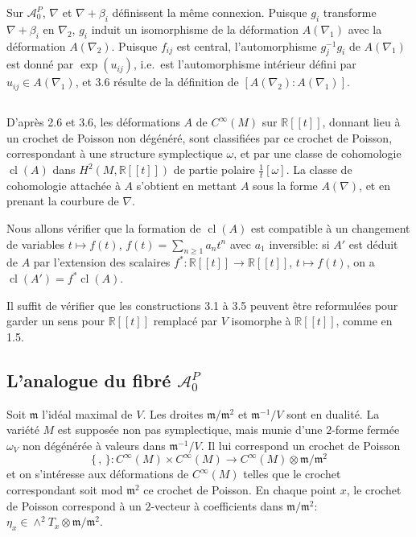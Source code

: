 \documentclass[11pt,a4paper]{article}
\theoremstyle{plain}
\theoremstyle{definition}
\DeclareMathOperator{\cl}{cl}
\newcommand{\R}{\mathbb{R}}
\begin{document}
Sur $\mathcal{A}_{0}^{P}$, $\nabla$ et $\nabla + \beta_{i}$ d\'efinissent la m\^eme connexion. Puisque $g_{i}$ transforme $\nabla + \beta_{i}$ en $\nabla_{2}$, $g_{i}$ induit un isomorphisme de la d\'eformation $A(\nabla_{1})$ avec la d\'eformation $A(\nabla_{2})$. Puisque $f_{ij}$ est central, l'automorphisme $g_{j}^{-1} g_{i}$ de $A(\nabla_{1})$ est donn\'e par $\exp(u_{ij})$, i.e.\ est l'automorphisme int\'erieur d\'efini par $u_{ij} \in A(\nabla_{1})$, et 3.6 r\'esulte de la d\'efinition de $[A(\nabla_{2}) : A(\nabla_{1})]$.

\subsection{}
D'apr\`es 2.6 et 3.6, les d\'eformations $A$ de $C^{\infty}(M)$ sur $\R[[t]]$, donnant lieu \`a
un crochet de Poisson non d\'eg\'en\'er\'e, sont classifi\'ees par ce crochet de Poisson,
correspondant \`a une structure symplectique $\omega$, et par une classe de cohomologie
$\cl(A)$ dans $H^{2}(M, \R[[t]])$ de partie polaire $\frac{1}{t}[\omega]$. La classe de cohomologie attach\'ee
\`a $A$ s'obtient en mettant $A$ sous la forme $A(\nabla)$, et en prenant la courbure de $\nabla$.

Nous allons v\'erifier que la formation de $\cl(A)$ est compatible \`a un changement de variables $t \mapsto f(t)$, $f(t) = \sum_{n \geq 1} a_{n} t^{n}$ avec $a_{1}$ inversible: si $A'$ est d\'eduit de $A$ par l'extension des scalaires $f^{*}: \R[[t]] \to \R[[t]]$, $t \mapsto f(t)$, on a $\cl(A') = f^{*}\cl(A)$.

Il suffit de v\'erifier que les constructions 3.1 \`a 3.5 peuvent \^etre reformul\'ees
pour garder un sens pour $\R[[t]]$ remplac\'e par $V$ isomorphe \`a $\R[[t]]$, comme en 1.5.

\subsection{L'analogue du fibr\'e $\mathcal{A}_{0}^{P}$}
Soit $\mathfrak{m}$ l'id\'eal maximal de $V$. Les droites $\mathfrak{m}/\mathfrak{m}^{2}$ et $\mathfrak{m}^{-1}/V$ sont en dualit\'e. La vari\'et\'e $M$ est suppos\'ee non pas symplectique, mais munie d'une $2$-forme ferm\'ee $\omega_{V}$ non d\'eg\'en\'er\'ee \`a valeurs dans $\mathfrak{m}^{-1}/V$. Il lui correspond un crochet de Poisson
\[
\{\, , \,\}: C^{\infty}(M) \times C^{\infty}(M) \longrightarrow C^{\infty}(M) \otimes \mathfrak{m}/\mathfrak{m}^{2}
\]
et on s'int\'eresse aux d\'eformations de $C^{\infty}(M)$ telles que le crochet correspondant soit mod $\mathfrak{m}^{2}$ ce crochet de Poisson. En chaque point $x$, le crochet de Poisson correspond \`a un $2$-vecteur \`a coefficients dans $\mathfrak{m}/\mathfrak{m}^{2}$: $\eta_{x} \in \wedge^{2} T_{x} \otimes \mathfrak{m}/\mathfrak{m}^{2}$.
\end{document}
